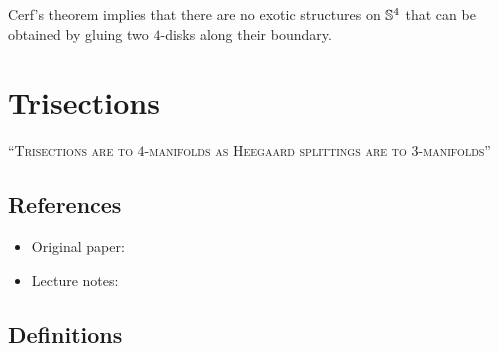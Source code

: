 \begin{observation}
	Cerf's theorem implies that there are no exotic structures
	on $\mathbb{S}^{4}$ that can be obtained by gluing
	two $4$-disks along their
	boundary.
\end{observation}





\newpage
\section{Trisections}

\begin{center}
	\textsc{``Trisections are to $4$-manifolds as Heegaard splittings are to
		$3$-manifolds''}
\end{center}

\subsection{References}

\begin{itemize}
	\item Original paper: \citep{gay2016trisecting}
	\item Lecture notes: \citep{gay2019heegaard}
\end{itemize}

\subsection{Definitions}

